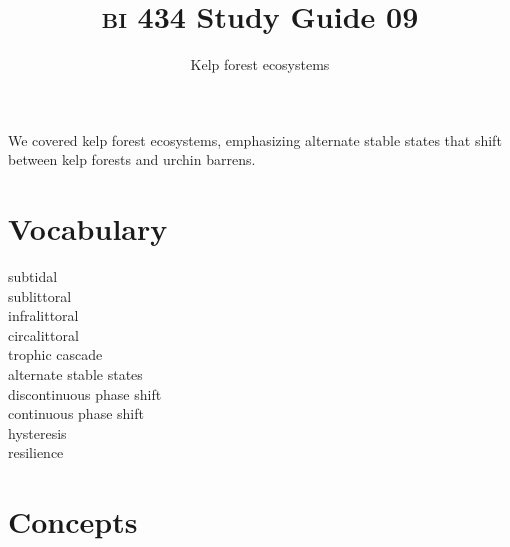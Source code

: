 \documentclass[letterpaper]{tufte-handout}
\title{{\scshape bi} 434 Study Guide 09}
\author{Kelp forest ecosystems}
\date{} %
\begin{document}
\maketitle	%


We covered kelp forest ecosystems, emphasizing alternate stable states that shift between kelp forests and urchin barrens.

\section*{Vocabulary}

\vspace{-1\baselineskip}
\begin{multicols}{2}
subtidal \\
sublittoral \\
infralittoral \\
circalittoral \\
trophic cascade \\
alternate stable states\\
discontinuous phase shift \\
continuous phase shift \\
hysteresis \\
resilience
\end{multicols}

\section*{Concepts}
\end{document}
